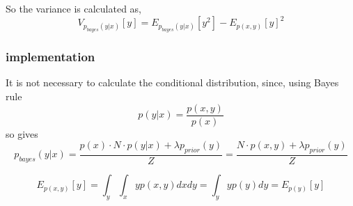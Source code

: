 So the variance is calculated as, 
$$V_{p_{bayes}(y|x)}[y] = E_{p_{bayes}(y|x)}[y^2] - E_{p(x,y)}[y]^2$$

\subsubsection*{implementation}
It is not necessary to calculate the conditional distribution, since, using Bayes rule
$$p(y|x) = \frac{p(x,y)}{p(x)}$$
so gives
$$p_{bayes}(y|x) = \frac{p(x)\cdot N \cdot p(y|x) + \lambda p_{prior}(y)}{Z} = \frac{N \cdot p(x,y) + \lambda p_{prior}(y)}{Z}$$

$$E_{p(x,y)}[y] = \int_y \int_x yp(x,y) dx dy = \int_y y p(y) dy = E_{p(y)}[y]$$